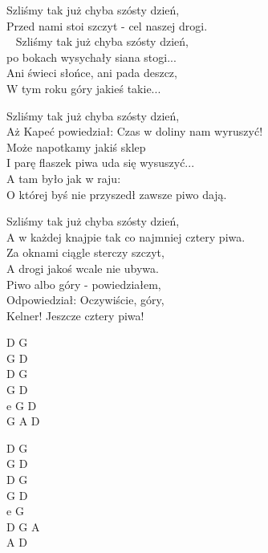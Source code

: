 \begin{text}
Szliśmy tak już chyba szósty dzień,\\
Przed nami stoi szczyt - cel naszej drogi.\\ 
Szliśmy tak już chyba szósty dzień,\\
po bokach wysychały siana stogi...\\
\vin Ani świeci słońce, ani pada deszcz,\\
\vin W tym roku góry jakieś takie... 

Szliśmy tak już chyba szósty dzień,\\
Aż Kapeć powiedział: Czas w doliny nam wyruszyć!\\
Może napotkamy jakiś sklep\\
I parę flaszek piwa uda się wysuszyć...\\
\vin A tam było jak w raju:\\
\vin O której byś nie przyszedł zawsze piwo dają.

Szliśmy tak już chyba szósty dzień,\\
A w każdej knajpie tak co najmniej cztery piwa.\\
Za oknami ciągle sterczy szczyt,\\
A drogi jakoś wcale nie ubywa.\\
\vin Piwo albo góry - powiedziałem,\\
\vin Odpowiedział: Oczywiście, góry,\\
\vin Kelner! Jeszcze cztery piwa!
\end{text}
\begin{chord}
D G\\
G D\\
D G\\
G D\\
e G D\\
G A D

D G\\
G D\\
D G\\
G D\\
e G\\
D G A\\
A D
\end{chord}